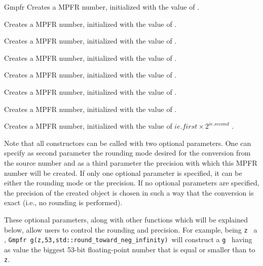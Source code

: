 \begin{ccRefClass} {Gmpfr}
        {Creates a MPFR number, initialized with the value of .}

        {Creates a MPFR number, initialized with the value of .}

        {Creates a MPFR number, initialized with the value of .}

        {Creates a MPFR number, initialized with the value of .}

        {Creates a MPFR number, initialized with the value of .}

        {Creates a MPFR number, initialized with the value of .}

        {Creates a MPFR number, initialized with the value of .}

        {Creates a MPFR number, initialized with the value of
        \( ie.first \times 2^{ie.second} \) .}

Note that all constructors can be called with two optional parameters.
One can specify as second parameter the rounding mode desired for
the conversion from the source number and as a third parameter the
precision with which this MPFR number will be created.  If only one
optional parameter is specified, it can be either the rounding mode
or the precision. If no optional parameters are specified, the
precision of the created object is chosen in such a way that the
conversion is exact (i.e., no rounding is performed).

These optional parameters, along with other functions which will be
explained below, allow users to control the rounding and precision.
For example, being \verb-z- \ a ,
\verb-Gmpfr g(z,53,std::round_toward_neg_infinity)-\ will construct a
 \verb-g- \ having as value the biggest 53-bit
floating-point number that is equal or smaller than to \verb-z-.



\end{ccRefClass}
